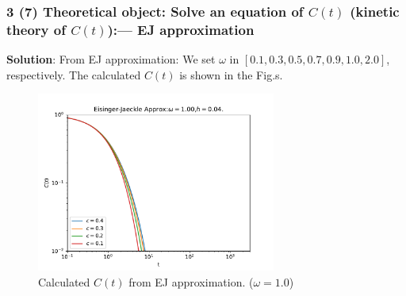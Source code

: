 \documentclass[8pt]{beamer}
\begin{document}
\begin{frame}
	\frametitle{3 (7) Theoretical object: Solve an equation of $C(t)$ (kinetic theory of $C(t)$):--- EJ approximation}

	
	{\textbf{Solution}}: From
	EJ approximation:
	We set $\omega$ in  $[0.1,0.3,0.5,0.7,0.9,1.0,2.0]$, respectively.  The calculated $C(t)$ is shown in the Fig.s.
	\begin{figure}
		\centering
		\includegraphics [width=0.7\textwidth] {../../EJ_approx/imag/beta_dependence_of_corr_omega1.00_step13_h0.04_loglog.pdf}
		\setlength{\abovecaptionskip}{0pt}
		\caption{Calculated $C(t)$ from EJ approximation. ($\omega = 1.0$) }
	\end{figure}
\end{frame}

	
		

\end{document}
